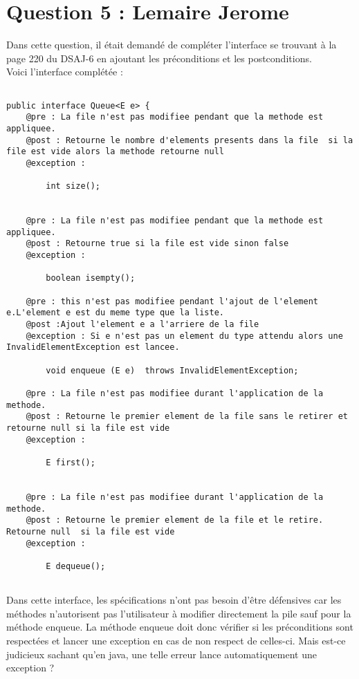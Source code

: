 \section*{Question 5 : Lemaire Jerome}
Dans cette question, il était demandé de compléter l'interface se trouvant à la page 220 du DSAJ-6 en ajoutant les préconditions et les postconditions.\\
Voici l'interface complétée :\\

\begin{lstlisting}

public interface Queue<E e> { 
	@pre : La file n'est pas modifiee pendant que la methode est appliquee.  
	@post : Retourne le nombre d'elements presents dans la file  si la file est vide alors la methode retourne null
	@exception : 
		
		int size();	
	
	
	@pre : La file n'est pas modifiee pendant que la methode est appliquee. 
	@post : Retourne true si la file est vide sinon false 
 	@exception : 

		boolean isempty();

	@pre : this n'est pas modifiee pendant l'ajout de l'element e.L'element e est du meme type que la liste.
	@post :Ajout l'element e a l'arriere de la file 
	@exception : Si e n'est pas un element du type attendu alors une 	InvalidElementException est lancee.

		void enqueue (E e)  throws InvalidElementException;

	@pre : La file n'est pas modifiee durant l'application de la methode. 
	@post : Retourne le premier element de la file sans le retirer et retourne null si la file est vide  
 	@exception : 

		E first();


	@pre : La file n'est pas modifiee durant l'application de la methode. 
	@post : Retourne le premier element de la file et le retire. Retourne null 	si la file est vide 
 	@exception : 

		E dequeue();
		
\end{lstlisting}



Dans cette interface, les spécifications n'ont pas besoin d'être défensives car les méthodes n'autorisent pas l'utilisateur à modifier directement la pile sauf pour la méthode enqueue. La méthode enqueue doit donc vérifier si les préconditions sont respectées et lancer une exception en cas de non respect de celles-ci. Mais est-ce judicieux sachant qu'en java, une telle erreur lance automatiquement une exception ?
